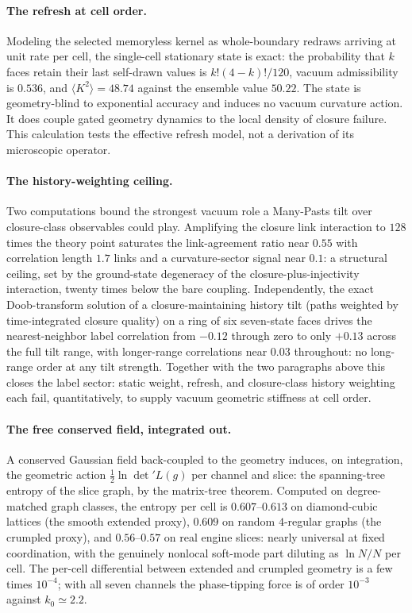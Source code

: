 \documentclass[11pt]{article}
\begin{document}
\paragraph{The refresh at cell order.} Modeling the selected memoryless kernel as whole-boundary redraws arriving at unit rate per cell, the single-cell stationary state is exact: the probability that $k$ faces retain their last self-drawn values is $k!(4-k)!/120$, vacuum admissibility is $0.536$, and $\langle K^2\rangle=48.74$ against the ensemble value $50.22$. The state is geometry-blind to exponential accuracy and induces no vacuum curvature action. It does couple gated geometry dynamics to the local density of closure failure. This calculation tests the effective refresh model, not a derivation of its microscopic operator.

\paragraph{The history-weighting ceiling.} Two computations bound the strongest vacuum role a Many-Pasts tilt over closure-class observables could play. Amplifying the closure link interaction to $128$ times the theory point saturates the link-agreement ratio near $0.55$ with correlation length $1.7$ links and a curvature-sector signal near $0.1$: a structural ceiling, set by the ground-state degeneracy of the closure-plus-injectivity interaction, twenty times below the bare coupling. Independently, the exact Doob-transform solution of a closure-maintaining history tilt (paths weighted by time-integrated closure quality) on a ring of six seven-state faces drives the nearest-neighbor label correlation from $-0.12$ through zero to only $+0.13$ across the full tilt range, with longer-range correlations near $0.03$ throughout: no long-range order at any tilt strength. Together with the two paragraphs above this closes the label sector: static weight, refresh, and closure-class history weighting each fail, quantitatively, to supply vacuum geometric stiffness at cell order.

\paragraph{The free conserved field, integrated out.} A conserved Gaussian field back-coupled to the geometry induces, on integration, the geometric action $\tfrac{1}{2}\ln\det'L(g)$ per channel and slice: the spanning-tree entropy of the slice graph, by the matrix-tree theorem. Computed on degree-matched graph classes, the entropy per cell is $0.607$--$0.613$ on diamond-cubic lattices (the smooth extended proxy), $0.609$ on random $4$-regular graphs (the crumpled proxy), and $0.56$--$0.57$ on real engine slices: nearly universal at fixed coordination, with the genuinely nonlocal soft-mode part diluting as $\ln N/N$ per cell. The per-cell differential between extended and crumpled geometry is a few times $10^{-4}$; with all seven channels the phase-tipping force is of order $10^{-3}$ against $k_0\simeq2.2$.
\end{document}
